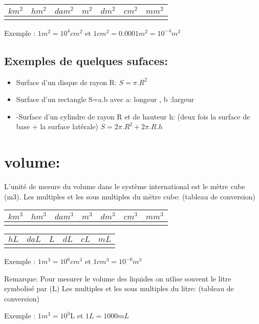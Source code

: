 \documentclass[12pt]{article}
\begin{document}
\begin{center}
   \begin{tabular}{ |c|c|c|c|c|c|c| }
      \hline
      $km^2$ & $hm^2$ & $dam^2$ & \bf{$m^2$} & $dm^2$ & $cm^2$ & $mm^2$ \\
      \hline
        &   &    &  &   &   & \\
\hline
\end{tabular}
\end{center}
Exemple : $1m^2 = 10^4 cm^2$ et $1cm^2 = 0.0001m^2 = 10^{-4} m^2$


\subsection{Exemples de quelques sufaces:}
\begin{itemize}
   \item Surface d’un disque de rayon R: $S = \pi.R^2$
   \item Surface d’un rectangle S=a.b avec a: longeur , b :largeur
   \item -Surface d’un cylindre de rayon R et de hauteur h: (deux fois la surface de base + la surface latérale) $S = 2\pi.R^2 + 2\pi.R.h$
\end{itemize}
\section{volume:}
L'unité de mesure du volume dans le système international est le mètre cube (m3).
Les multiples et les sous multiples du mètre cube: (tableau de conversion)
\begin{center}
   \begin{tabular}{ |c|c|c|c|c|c|c| }
      \hline
      $km^3$ & $hm^3$ & $dam^3$ & \bf{$m^3$} & $dm^3$ & $cm^3$ & $mm^3$ \\
      \hline
        &   &    &  &   &   & \\
\hline
\end{tabular}
   \begin{tabular}{ |c|c|c|c|c|c| }
      \hline
       $hL$ & $daL$ & \bf{$L$} & $dL$ & $cL$ & $mL$ \\
      \hline
        &   &    &  &   &    \\
\hline
\end{tabular}
\end{center}

Exemple : $1m^3 = 10^6 cm^3$ et $1cm^3 =  10^{-6} m^3$

Remarque: Pour mesurer le volume des liquides on utlise souvent le litre symbolisé par (L)
Les multiples et les sous multiples du litre: (tableau de conversion)
\begin{center}

\end{center}

Exemple : $1m^3 = 10^3 $L et $1L =  1000 mL$ 
\end{document}
